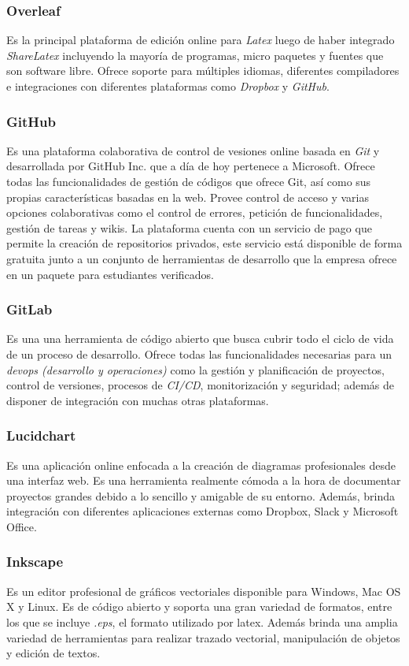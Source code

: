         \subsubsection{Overleaf}
            Es la principal plataforma de edición online para \textit{Latex} luego de haber integrado \textit{ShareLatex} incluyendo la mayoría de programas, micro paquetes y fuentes que son software libre. Ofrece soporte para múltiples idiomas, diferentes compiladores e integraciones con diferentes plataformas como \textit{Dropbox} y \textit{GitHub}.

        \subsubsection{GitHub}
            Es una plataforma colaborativa de control de vesiones online basada en \textit{Git} y desarrollada por GitHub Inc. que a día de hoy pertenece a Microsoft. Ofrece todas las funcionalidades de gestión de códigos que ofrece Git, así como sus propias características basadas en la web. Provee control de acceso y varias opciones colaborativas como el control de errores, petición de funcionalidades, gestión de tareas y wikis. La plataforma cuenta con un servicio de pago que permite la creación de repositorios privados, este servicio está disponible de forma gratuita junto a un conjunto de herramientas de desarrollo que la empresa ofrece en un paquete para estudiantes verificados.
            
        \subsubsection{GitLab}
            Es una una herramienta de código abierto que busca cubrir todo el ciclo de vida de un proceso de desarrollo. Ofrece todas las funcionalidades necesarias para un \textit{devops (desarrollo y operaciones)} como la gestión y planificación de proyectos, control de versiones, procesos de \textit{CI/CD}, monitorización y seguridad; además de disponer de integración con muchas otras plataformas. \cite{gitlab}

        \subsubsection{Lucidchart}
            Es una aplicación online enfocada a la creación de diagramas profesionales desde una interfaz web. Es una herramienta realmente cómoda a la hora de documentar proyectos grandes debido a lo sencillo y amigable de su entorno. Además, brinda integración con diferentes aplicaciones externas como Dropbox, Slack y Microsoft Office. 

        \subsubsection{Inkscape}
            Es un editor profesional de gráficos vectoriales disponible para Windows, Mac OS X y Linux. Es de código abierto y soporta una gran variedad de formatos, entre los que se incluye \textit{.eps}, el formato utilizado por latex. Además brinda una amplia variedad de herramientas para realizar trazado vectorial, manipulación de objetos y edición de textos.
